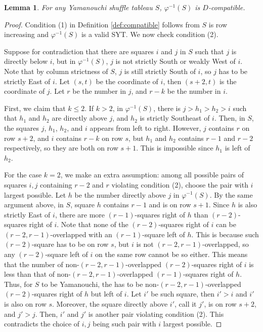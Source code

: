 \documentclass[10pt,a4paper]{article}
\newtheorem{lemma}[theorem]{Lemma}
\theoremstyle{definition}
\numberwithin{equation}{section}
\begin{document}
    \begin{lemma}\label{lem:phiS-comp}
        For any Yamanouchi shuffle tableau $S$, $\varphi^{-1}(S)$ is $D$-compatible.
    \end{lemma}

    \begin{proof}
        Condition (1) in Definition \ref{def:compatible} follows from $S$ is row increasing and $\varphi^{-1}(S)$ is a valid SYT. We now check condition (2).

        Suppose for contradiction that there are squares $i$ and $j$ in $S$ such that $j$ is directly below $i$, but in $\varphi^{-1}(S)$, $j$ is not strictly South or weakly West of $i$. Note that by column strictness of $S$, $j$ is still strictly South of $i$, so $j$ has to be strictly East of $i$. Let $(s,t)$ be the coordinate of $i$, then $(s+2,t)$ is the coordinate of $j$. Let $r$ be the number in $j$, and $r-k$ be the number in $i$.

        First, we claim that $k \leq 2$. If $k > 2$, in $\varphi^{-1}(S)$, there is $j > h_1>h_2> i$ such that $h_1$ and $h_2$ are directly above $j$, and $h_2$ is strictly Southeast of $i$. Then, in $S$, the squares $j$, $h_1$, $h_2$, and $i$ appears from left to right. However, $j$ contains $r$ on row $s+2$, and $i$ contains $r-k$ on row $s$, but $h_1$ and $h_2$ contains $r-1$ and $r-2$ respectively, so they are both on row $s+1$. This is impossible since $h_1$ is left of $h_2$.

        For the case $k = 2$, we make an extra assumption: among all possible pairs of squares $i,j$ containing $r-2$ and $r$ violating condition (2), choose the pair with $i$ largest possible. Let $h$ be the number directly above $j$ in $\varphi^{-1}(S)$. By the same argument above, in $S$, square $h$ contains $r-1$ and is on row $s+1$. Since $h$ is also strictly East of $i$, there are more $(r-1)$-squares right of $h$ than $(r-2)$-squares right of $i$. Note that none of the $(r-2)$-squares right of $i$ can be $(r-2,r-1)$-overlapped with an $(r-1)$-square left of $h$. This is because such $(r-2)$-square has to be on row $s$, but $i$ is not $(r-2,r-1)$-overlapped, so any $(r-2)$-square left of $i$ on the same row cannot be so either. This means that the number of non-$(r-2,r-1)$-overlapped $(r-2)$-squares right of $i$ is less than that of non-$(r-2,r-1)$-overlapped $(r-1)$-squares right of $h$. Thus, for $S$ to be Yamanouchi, the has to be non-$(r-2,r-1)$-overlapped $(r-2)$-squares right of $h$ but left of $i$. Let $i'$ be such square, then $i' > i$ and $i'$ is also on row $s$. Moreover, the square directly above $i'$, call it $j'$, is on row $s+2$, and $j' > j$. Then, $i'$ and $j'$ is another pair violating condition (2). This contradicts the choice of $i,j$ being such pair with $i$ largest possible.


\end{proof}
\end{document}
